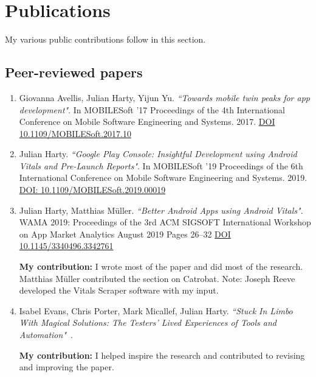 \section{Publications}
\label{section-publications}
My various public contributions follow in this section.

\subsection{Peer-reviewed papers}
\begin{enumerate}
    \item 	Giovanna Avellis, Julian Harty, Yijun Yu. \emph{``Towards mobile twin peaks for app development"}. In MOBILESoft '17 Proceedings of the 4th International Conference on Mobile Software Engineering and Systems. 2017. \href{https://doi.org/10.1109/MOBILESoft.2017.10}{DOI 10.1109/MOBILESoft.2017.10}~\citep{avellis_harty_yu_towards_mobile_twin_peaks}
    

    \item Julian Harty. \emph{``Google Play Console: Insightful Development using Android Vitals and Pre-Launch Reports"}. In MOBILESoft '19 Proceedings of the 6th International Conference on Mobile Software Engineering and Systems. 2019. \href{https://doi.org/10.1109/MOBILESoft.2019.00019}{DOI: 10.1109/MOBILESoft.2019.00019} ~\citep{harty_google_play_console_insightful_development_using_android_vitals_and_pre_launch_reports}
    
    \item Julian Harty, Matthias Müller. \emph{``Better Android Apps using Android Vitals"}.  WAMA 2019: Proceedings of the 3rd ACM SIGSOFT International Workshop on App Market Analytics August 2019 Pages 26–32 \href{https://doi.org/10.1145/3340496.3342761}{DOI 10.1145/3340496.3342761}~\citep{harty_better_android_apps_using_android_vitals}
    
    \textbf{My contribution:} I wrote most of the paper and did most of the research. Matthias Müller contributed the section on Catrobat. Note: Joseph Reeve developed the Vitals Scraper software with my input.
    
    \item Isabel Evans, Chris Porter, Mark Micallef, Julian Harty. \emph{``Stuck In Limbo With Magical Solutions: The Testers’ Lived Experiences of Tools and Automation"}~\citep{evans2020stuck}. 
    
    \textbf{My contribution:} I helped inspire the research and contributed to revising and improving the paper.
    

\end{enumerate}
